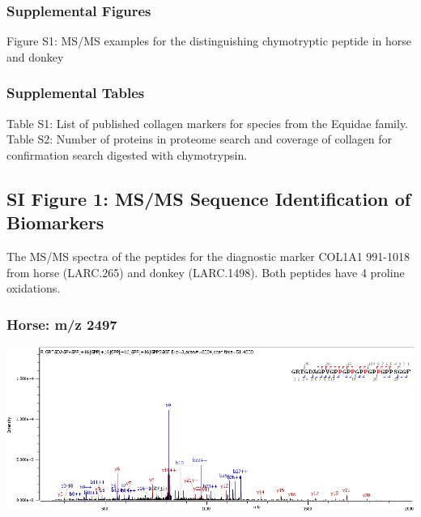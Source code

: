 \documentclass[
]{article}
\begin{document}
\hypertarget{supplemental-figures}{%
\subsubsection*{Supplemental Figures}\label{supplemental-figures}}

Figure S1: MS/MS examples for the distinguishing chymotryptic peptide in horse and donkey\\

\hypertarget{supplemental-tables}{%
\subsubsection*{Supplemental Tables}\label{supplemental-tables}}

Table S1: List of published collagen markers for species from the Equidae family.\\
Table S2: Number of proteins in proteome search and coverage of collagen for confirmation search digested with chymotrypsin.

\newpage

\hypertarget{si-figure-1-msms-sequence-identification-of-biomarkers}{%
\subsection*{SI Figure 1: MS/MS Sequence Identification of Biomarkers}\label{si-figure-1-msms-sequence-identification-of-biomarkers}}

The MS/MS spectra of the peptides for the diagnostic marker COL1A1 991-1018 from horse (LARC.265) and donkey (LARC.1498). Both peptides have 4 proline oxidations.

\hypertarget{horse-mz-2497}{%
\subsubsection*{Horse: m/z 2497}\label{horse-mz-2497}}

\begin{center}\includegraphics[width=1\linewidth]{../img/265-2497} \end{center}
\end{document}
